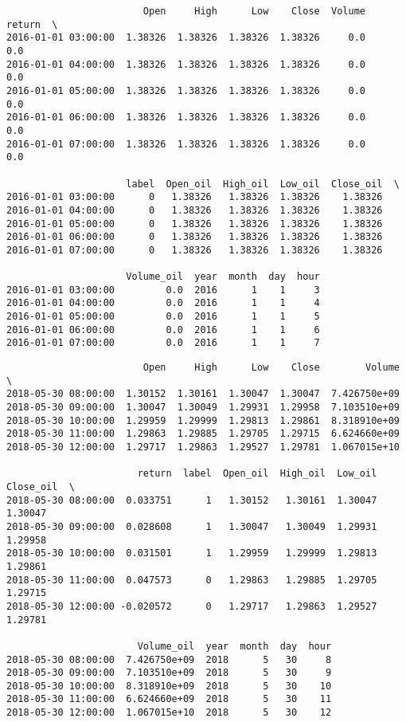\documentclass[11pt]{article}
\begin{document}
    
    
    \begin{verbatim}
                        Open     High      Low    Close  Volume  return  \
2016-01-01 03:00:00  1.38326  1.38326  1.38326  1.38326     0.0     0.0   
2016-01-01 04:00:00  1.38326  1.38326  1.38326  1.38326     0.0     0.0   
2016-01-01 05:00:00  1.38326  1.38326  1.38326  1.38326     0.0     0.0   
2016-01-01 06:00:00  1.38326  1.38326  1.38326  1.38326     0.0     0.0   
2016-01-01 07:00:00  1.38326  1.38326  1.38326  1.38326     0.0     0.0   

                     label  Open_oil  High_oil  Low_oil  Close_oil  \
2016-01-01 03:00:00      0   1.38326   1.38326  1.38326    1.38326   
2016-01-01 04:00:00      0   1.38326   1.38326  1.38326    1.38326   
2016-01-01 05:00:00      0   1.38326   1.38326  1.38326    1.38326   
2016-01-01 06:00:00      0   1.38326   1.38326  1.38326    1.38326   
2016-01-01 07:00:00      0   1.38326   1.38326  1.38326    1.38326   

                     Volume_oil  year  month  day  hour  
2016-01-01 03:00:00         0.0  2016      1    1     3  
2016-01-01 04:00:00         0.0  2016      1    1     4  
2016-01-01 05:00:00         0.0  2016      1    1     5  
2016-01-01 06:00:00         0.0  2016      1    1     6  
2016-01-01 07:00:00         0.0  2016      1    1     7  
    \end{verbatim}

    
    
    \begin{verbatim}
                        Open     High      Low    Close        Volume  \
2018-05-30 08:00:00  1.30152  1.30161  1.30047  1.30047  7.426750e+09   
2018-05-30 09:00:00  1.30047  1.30049  1.29931  1.29958  7.103510e+09   
2018-05-30 10:00:00  1.29959  1.29999  1.29813  1.29861  8.318910e+09   
2018-05-30 11:00:00  1.29863  1.29885  1.29705  1.29715  6.624660e+09   
2018-05-30 12:00:00  1.29717  1.29863  1.29527  1.29781  1.067015e+10   

                       return  label  Open_oil  High_oil  Low_oil  Close_oil  \
2018-05-30 08:00:00  0.033751      1   1.30152   1.30161  1.30047    1.30047   
2018-05-30 09:00:00  0.028608      1   1.30047   1.30049  1.29931    1.29958   
2018-05-30 10:00:00  0.031501      1   1.29959   1.29999  1.29813    1.29861   
2018-05-30 11:00:00  0.047573      0   1.29863   1.29885  1.29705    1.29715   
2018-05-30 12:00:00 -0.020572      0   1.29717   1.29863  1.29527    1.29781   

                       Volume_oil  year  month  day  hour  
2018-05-30 08:00:00  7.426750e+09  2018      5   30     8  
2018-05-30 09:00:00  7.103510e+09  2018      5   30     9  
2018-05-30 10:00:00  8.318910e+09  2018      5   30    10  
2018-05-30 11:00:00  6.624660e+09  2018      5   30    11  
2018-05-30 12:00:00  1.067015e+10  2018      5   30    12  
    \end{verbatim}
\end{document}

